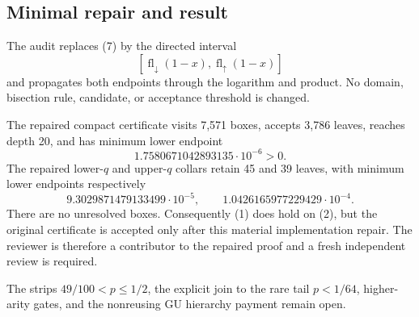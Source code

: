 \subsection*{Minimal repair and result}

The audit replaces (7) by the directed interval
\[
 [\operatorname{fl}_{\downarrow}(1-x),
   \operatorname{fl}_{\uparrow}(1-x)]                 \tag{8}
\]
and propagates both endpoints through the logarithm and product.  No domain,
bisection rule, candidate, or acceptance threshold is changed.

The repaired compact certificate visits 7,571 boxes, accepts 3,786 leaves,
reaches depth 20, and has minimum lower endpoint
\[
 1.7580671042893135\cdot10^{-6}>0.                    \tag{9}
\]
The repaired lower-$q$ and upper-$q$ collars retain 45 and 39 leaves, with
minimum lower endpoints respectively
\[
 9.3029871479133499\cdot10^{-5},\qquad
 1.0426165977229429\cdot10^{-4}.                      \tag{10}
\]
There are no unresolved boxes.  Consequently (1) does hold on (2), but the
original certificate is accepted only after this material implementation
repair.  The reviewer is therefore a contributor to the repaired proof and
a fresh independent review is required.

The strips $49/100<p\le1/2$, the explicit join to the rare tail
$p<1/64$, higher-arity gates, and the nonreusing GU hierarchy payment remain
open.

